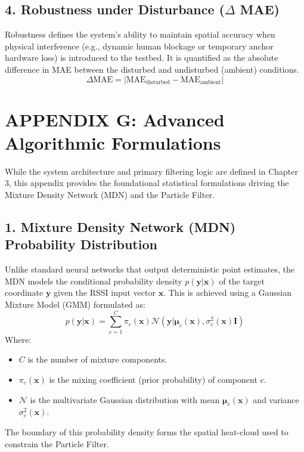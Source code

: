 \subsection*{4. Robustness under Disturbance ($\Delta$ MAE)}
Robustness defines the system's ability to maintain spatial accuracy when physical interference (e.g., dynamic human blockage or temporary anchor hardware loss) is introduced to the testbed. It is quantified as the absolute difference in MAE between the disturbed and undisturbed (ambient) conditions.
\begin{equation}
    \Delta\text{MAE} = |\text{MAE}_{\text{disturbed}} - \text{MAE}_{\text{ambient}}|
\end{equation}

\clearpage

\section*{APPENDIX G: Advanced Algorithmic Formulations}
\label{app:algorithms}

While the system architecture and primary filtering logic are defined in Chapter 3, this appendix provides the foundational statistical formulations driving the Mixture Density Network (MDN) and the Particle Filter.

\vspace{1em}

\subsection*{1. Mixture Density Network (MDN) Probability Distribution}
Unlike standard neural networks that output deterministic point estimates, the MDN models the conditional probability density $p(\mathbf{y}|\mathbf{x})$ of the target coordinate $\mathbf{y}$ given the RSSI input vector $\mathbf{x}$. This is achieved using a Gaussian Mixture Model (GMM) formulated as:
\begin{equation}
    p(\mathbf{y}|\mathbf{x}) = \sum_{c=1}^{C} \pi_c(\mathbf{x}) \mathcal{N}(\mathbf{y} | \boldsymbol{\mu}_c(\mathbf{x}), \sigma_c^2(\mathbf{x})\mathbf{I})
\end{equation}
Where:
\begin{itemize}
    \item $C$ is the number of mixture components.
    \item $\pi_c(\mathbf{x})$ is the mixing coefficient (prior probability) of component $c$.
    \item $\mathcal{N}$ is the multivariate Gaussian distribution with mean $\boldsymbol{\mu}_c(\mathbf{x})$ and variance $\sigma_c^2(\mathbf{x})$.
\end{itemize}
The boundary of this probability density forms the spatial heat-cloud used to constrain the Particle Filter.

